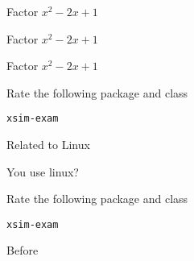 \documentclass{article}
\begin{document}
\begin{enumext}[save-ans=newww,columns=1,check-ans=true,show-pos=true,nosep,save-ref=true]
  \item Factor $x^{2}-2x+1$ 
  \item Factor $x^{2}-2x+1$ 
  \item Factor $x^{2}-2x+1$ 
  \item Rate the following package and class
        \begin{enumext}
          \item \texttt{xsim-exam} %
        \end{enumext}
    \item Related to Linux
    \begin{enumext}[nosep,columns*=2]
      \item You use linux? 
      \item Rate the following package and class
        \begin{enumext*}
          \item \texttt{xsim-exam} 
        \end{enumext*}
    \end{enumext}
\end{enumext}


\stop


Before
\end{document}
